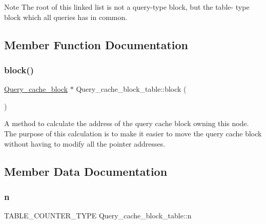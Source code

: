 \begin{DoxyNote}{Note}
The root of this linked list is not a query-\/type block, but the table-\/ type block which all queries has in common. 
\end{DoxyNote}


\subsection{Member Function Documentation}
\mbox{\label{structQuery__cache__block__table_a78a2985cc946dd25eb1cb239b7c4033e}} 
\subsubsection{\texorpdfstring{block()}{block()}}
{\footnotesize\ttfamily \mbox{\hyperlink{structQuery__cache__block}{Query\+\_\+cache\+\_\+block}} $\ast$ Query\+\_\+cache\+\_\+block\+\_\+table\+::block (\begin{DoxyParamCaption}{ }\end{DoxyParamCaption})\hspace{0.3cm}{\ttfamily [inline]}}

A method to calculate the address of the query cache block owning this node. The purpose of this calculation is to make it easier to move the query cache block without having to modify all the pointer addresses. 

\subsection{Member Data Documentation}
\mbox{\label{structQuery__cache__block__table_a49ac84a1f8f0dfbdd15ae144e21b7d4b}} 
\subsubsection{\texorpdfstring{n}{n}}
{\footnotesize\ttfamily T\+A\+B\+L\+E\+\_\+\+C\+O\+U\+N\+T\+E\+R\+\_\+\+T\+Y\+PE Query\+\_\+cache\+\_\+block\+\_\+table\+::n}


